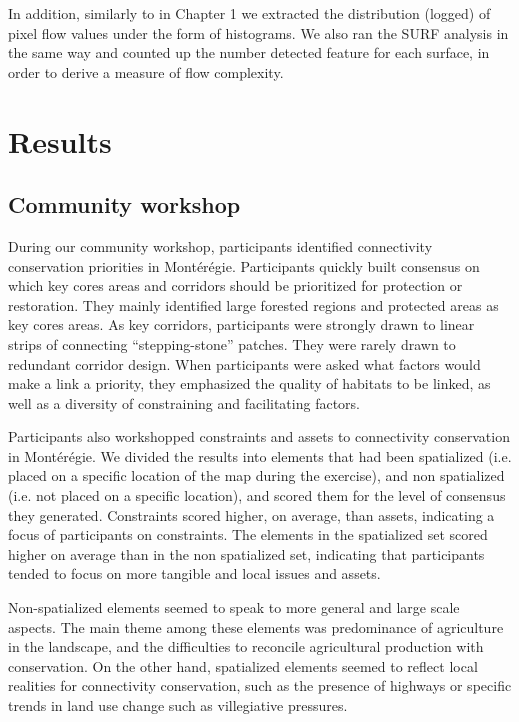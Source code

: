 In addition, similarly to in Chapter 1 we extracted the distribution (logged) of pixel flow values under the form of histograms. We also ran the SURF analysis in the same way and counted up the number detected feature for each surface, in order to derive a measure of flow complexity.\\

\section{Results}

\subsection{Community workshop}

During our community workshop, participants identified connectivity conservation priorities in Montérégie. Participants quickly built consensus on which key cores areas and corridors should be prioritized for protection or restoration. They mainly identified large forested regions and protected areas as key cores areas. As key corridors, participants were strongly drawn to linear strips of connecting “stepping-stone” patches. They were rarely drawn to redundant corridor design. When participants were asked what factors would make a link a priority, they emphasized the quality of habitats to be linked, as well as a diversity of constraining and facilitating factors.

Participants also workshopped constraints and assets to connectivity conservation in Montérégie. We divided the results into elements that had been spatialized (i.e. placed on a specific location of the map during the exercise), and non spatialized (i.e. not placed on a specific location), and scored them for the level of consensus they generated. Constraints scored higher, on average, than assets, indicating a focus of participants on constraints. The elements in the spatialized set scored higher on average than in the non spatialized set, indicating that participants tended to focus on more tangible and local issues and assets.

Non-spatialized elements seemed to speak to more general and large scale aspects. The main theme among these elements was predominance of agriculture in the landscape, and the difficulties to reconcile agricultural production with conservation. On the other hand, spatialized elements seemed to reflect local realities for connectivity conservation, such as the presence of highways or specific trends in land use change such as villegiative pressures. \\

